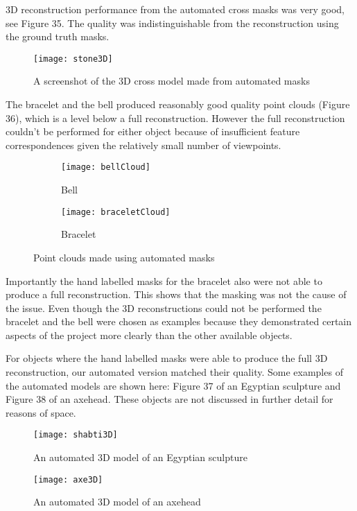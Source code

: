 \documentclass[12pt]{IIBproject}
\begin{document}
3D reconstruction performance from the automated cross masks was very good, see Figure 35\cite{crossModel}. The quality was indistinguishable from the reconstruction using the ground truth masks.
\begin{figure}[H]
  
  \centering
    \texttt{[image: stone3D]}
    \caption{A screenshot of the 3D cross model made from automated masks}
\end{figure}
The bracelet and the bell produced reasonably good quality point clouds (Figure 36), which is a level below a full reconstruction. However the full reconstruction couldn't be performed for either object because of insufficient feature correspondences given the relatively small number of viewpoints. 
\begin{figure}[H]
\centering
\begin{subfigure}{.45\textwidth}
  \centering
  \texttt{[image: bellCloud]}
  \caption{Bell}
  \label{fig:sub2}
\end{subfigure}
\begin{subfigure}{.45\textwidth}
  \centering
  \texttt{[image: braceletCloud]}
  \caption{Bracelet}
  \label{fig:sub2}
\end{subfigure}

\caption{Point clouds made using automated masks}
\label{fig:test}
\end{figure}

Importantly the hand labelled masks for the bracelet also were not able to produce a full reconstruction. This shows that the masking was not the cause of the issue. Even though the 3D reconstructions could not be performed the bracelet and the bell were chosen as examples because they demonstrated certain aspects of the project more clearly than the other available objects. 

For objects where the hand labelled masks were able to produce the full 3D reconstruction, our automated version matched their quality. Some examples of the automated models are shown here: Figure 37 of an Egyptian sculpture and Figure 38 of an axehead. These objects are not discussed in further detail for reasons of space.
\begin{figure}[H]
  
  \centering
    \texttt{[image: shabti3D]}
    \caption{An automated 3D model of an Egyptian sculpture}
\end{figure}
\begin{figure}[H]
  
  \centering
    \texttt{[image: axe3D]}
    \caption{An automated 3D model of an axehead}
\end{figure}
\end{document}
